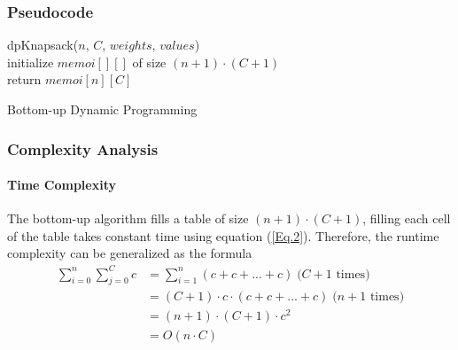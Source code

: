 \documentclass{article}
\begin{document}
\subsubsection{Pseudocode}
\begin{algorithm}[H]
\SetAlgoLined
{}
dpKnapsack($n$, $C$, $weights$, $values$) \\
initialize $memoi[][]$ of size $(n+1)\cdot (C+1)$\; \\
return $memoi[n][C]$ \;
 \caption{Bottom-up Dynamic Programming}
\end{algorithm}

\subsubsection{Complexity Analysis}
\paragraph{Time Complexity}
The bottom-up algorithm fills a table of size $(n+1)\cdot(C+1)$, filling each cell of the table takes constant time using equation (\ref{Eq.2}). Therefore, the runtime complexity can be generalized as the formula
\begin{equation}
    \begin{split}
      \sum_{i=0}^{n} \sum_{j=0}^{C} c & = \sum_{i=1}^{n} (c + c + ... + c) \; \text{($C+1$ times)} \\
        & = (C+1) \cdot c \cdot (c + c + ... + c) \; \text{($n+1$ times)} \\
        & = (n+1) \cdot (C+1) \cdot c^2 \\
        & = O(n \cdot C)  
    \end{split}
    \label{Eq.5}
\end{equation}
\end{document}
